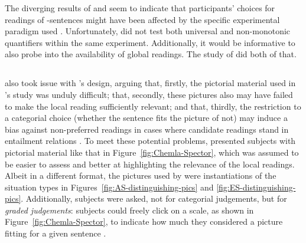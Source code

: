 \documentclass[fleqn,reqno,10pt]{article}
\newcommand{\as}{\acro{as}}
\begin{document}
The diverging results of
\citeauthor{GeurtsPouscoulous2009:Embedded-Implic} and
\citeauthor{CliftonDube2010:Embedded-Implic} seem to indicate that
participants' choices for readings of \as-sentences might have been
affected by the specific experimental paradigm used \citep[but
see][for critique of the latter
design]{GeurtsTielvan-Tiel2013:Embedded-Scalar}. Unfortunately,
\citet{CliftonDube2010:Embedded-Implic} did not test both universal
and non-monotonic quantifiers within the same
experiment. Additionally, it would be informative to also probe into
the availability of global readings. The study of
\citet{ChemlaSpector2010:Experimental-Ev} did both of that.

\subsection{\citet{ChemlaSpector2010:Experimental-Ev}}
\label{sec:Chemla-Spector}

\citet{ChemlaSpector2010:Experimental-Ev} also took issue with
\citeauthor{GeurtsPouscoulous2009:Embedded-Implic}'s design, arguing
that, firstly, the pictorial material used in
\citeauthor{GeurtsPouscoulous2009:Embedded-Implic}'s study was unduly
difficult; that, secondly, these pictures also may have failed to make
the local reading sufficiently relevant; and that, thirdly, the
restriction to a categorial choice (whether the sentence fits the
picture of not) may induce a bias against non-preferred readings in
cases where candidate readings stand in entailment relations
\citep[see][for this latter
criticism]{Sauerland2010:Embedded-Implic}. To meet these potential
problems, \citet{ChemlaSpector2010:Experimental-Ev} presented subjects
with pictorial material like that in Figure~\ref{fig:Chemla-Spector},
which was assumed to be easier to assess and better at highlighting
the relevance of the local readings. Albeit in a different format, the
pictures used by \citeauthor{ChemlaSpector2010:Experimental-Ev} were
instantiations of the situation types in
Figures~\ref{fig:AS-distinguishing-pics} and
\ref{fig:ES-distinguishing-pics}. Additionally, subjects were asked,
not for categorial judgements, but for \textit{graded judgements}:
subjects could freely click on a scale, as shown in
Figure~\ref{fig:Chemla-Spector}, to indicate how much they considered
a picture fitting for a given sentence \citep[see][for more on this
method]{Chemla2009:Presuppositions}. 
\end{document}
